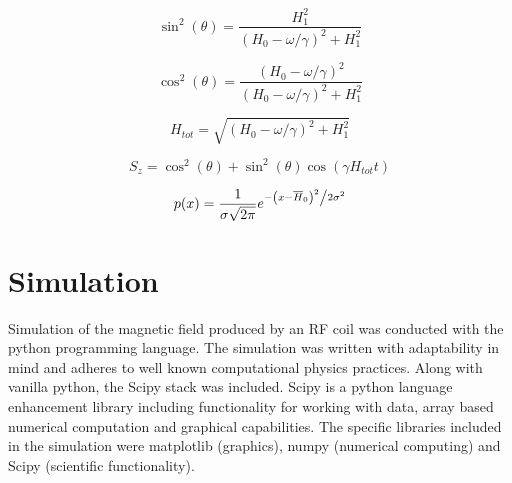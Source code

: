 \documentclass[%
 reprint,
 amsmath,
 amssymb,
 aps,
]{revtex4-1}
\begin{document}
	\begin{equation}
	\sin^2(\theta) = \frac{H_1^2}{(H_0 - \omega/\gamma)^2 + H_1^2}
	\end{equation}
	
	\begin{equation}
	\cos^2(\theta) = \frac{(H_0 - \omega/\gamma)^2}{(H_0 - \omega/\gamma)^2 + H_1^2}
	\end{equation}
	
	\begin{equation}
	H_{tot} = \sqrt{(H_0 - \omega/\gamma)^2 + H_1^2}
	\end{equation}
	
	
	
	\begin{equation}
	S_z = \cos^2(\theta) + \sin^2(\theta) \cos(\gamma H_{tot} t)
	\end{equation}

	
	
	
	

	
	
	 
	
	\begin{equation}
	p(x) = \frac{1}{ { \sigma \sqrt { 2 \pi } } }
	e^{{{ - \left( {x -  \overline{H}_0  } \right)^2 } \mathord{\left/ {\vphantom {{ - \left( {x -  \overline{H}_0 } \right)^2 } {2\sigma ^2 }}} 	\right. 	\kern-\nulldelimiterspace} {2\sigma ^2 }}}
	\end{equation}

\section{\label{sec:level1}Simulation}


	Simulation of the magnetic field produced by an RF coil was conducted with the python programming language. The simulation was written with adaptability in mind and adheres to well known computational physics practices. Along with vanilla python, the Scipy stack was included. Scipy is a python language enhancement library including functionality for working with data, array based numerical computation and graphical capabilities. The specific libraries included in the simulation were matplotlib (graphics), numpy (numerical computing) and Scipy (scientific functionality). 
	
\end{document}
